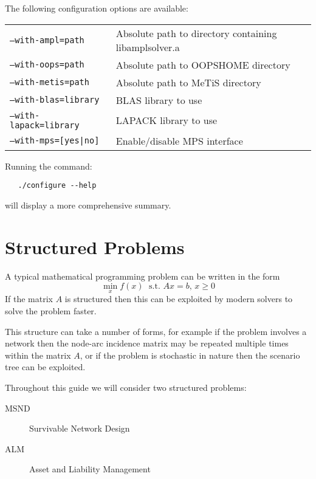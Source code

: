 \documentclass[10pt,a4paper]{report}
\begin{document}
The following configuration options are available:

\begin{tabular}{ll}
   \tt --with-ampl=path & Absolute path to directory containing libamplsolver.a \\
   \tt --with-oops=path & Absolute path to OOPSHOME directory \\
   \tt --with-metis=path & Absolute path to MeTiS directory \\
   \tt --with-blas=library & BLAS library to use \\
   \tt --with-lapack=library & LAPACK library to use \\
   \tt --with-mps=[yes|no] & Enable/disable MPS interface
\end{tabular}

Running the command:
\begin{verbatim}
   ./configure --help
\end{verbatim}
will display a more comprehensive summary.

\chapter{Structured Problems}
\label{background}

A typical mathematical programming problem can be written in the form
\begin{equation}
\min_x f(x)\; \text{~s.t.~} Ax=b,\, x\ge 0
\end{equation}
If the matrix $A$ is structured then this can be exploited by modern solvers
to solve the problem faster.

This structure can take a number of forms, for example if the problem involves
a network then the node-arc incidence matrix may be repeated multiple times
within the matrix $A$, or if the problem is stochastic in nature then the
scenario tree can be exploited.

Throughout this guide we will consider two structured problems:
\begin{description}
   \item[MSND] Survivable Network Design
   \item[ALM] Asset and Liability Management
\end{description}
\end{document}
